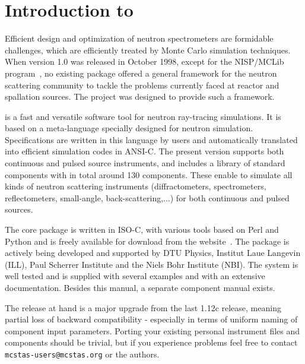 
\chapter{Introduction to \MCS}

Efficient design and optimization of neutron spectrometers are
formidable challenges, which are efficiently treated by Monte Carlo
simulation techniques.
When \MCS version 1.0 was released in October
1998, except for the NISP/MCLib program~\cite{nisp_webpage}, no existing package offered a general framework for the neutron
scattering community to tackle the problems currently faced at reactor and
spallation sources. The \MCS project was designed to provide such a framework.

\MCS %
is a fast and versatile software tool for neutron ray-tracing simulations.
It is based on a meta-language specially designed for neutron
simulation. Specifications are written in this language by users and
automatically translated into efficient simulation codes in ANSI-C.
The present version supports both continuous and pulsed source instruments, and includes a library of standard
components with in total around 130 components. These enable to simulate all kinds of neutron scattering instruments (diffractometers, spectrometers, reflectometers, small-angle, back-scattering,...) for both continuous and pulsed sources.

The core \MCS package is written in ISO-C, with various tools based
on Perl and Python and is freely available for download
from the \MCS website~\cite{mcstas_webpage}. The package is actively
being developed and supported by DTU Physics,
Institut Laue Langevin (ILL), Paul Scherrer Institute and the Niels
Bohr Institute (NBI).
The system is well tested and
is supplied with several examples and with an extensive documentation.
Besides this manual, a separate component manual exists.

The release at hand \MCS \version is a major upgrade from the last
1.12c release, meaning partial loss of backward compatibility -
especially in terms of uniform naming of component input
parameters. Porting your existing personal instrument files and
components should be trivial, but if you experience problems feel free
to contact  \verb+mcstas-users@mcstas.org+ or the authors.

